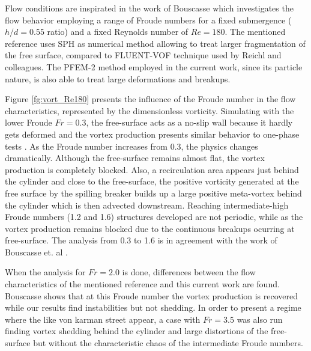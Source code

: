 Flow conditions are inspirated in the work of Bouscasse \cite{Bouscasse14} which investigates the flow behavior employing a range of Froude numbers for a fixed submergence ($h/d=0.55$ ratio) and a fixed Reynolds number of $Re=180$. The mentioned reference uses SPH as numerical method allowing to treat larger fragmentation of the free surface, compared to FLUENT-VOF technique used by Reichl and colleagues. The PFEM-2 method employed in the current work, since its particle nature, is also able to treat large deformations and breakups.

Figure \ref{fg:vort_Re180} presents the influence of the Froude number in the flow characteristics, represented by the dimensionless vorticity. Simulating with the lower Froude $Fr=0.3$, the free-surface acts as a no-slip wall because it hardly gets deformed and the vortex production presents similar behavior to one-phase tests \cite{PRICE2002175}. As the Froude number increases from 0.3, the physics changes dramatically. Although the free-surface remains almost flat, the vortex production is completely blocked. Also, a recirculation area appears just behind the cylinder and close to the free-surface, the positive vorticity generated at the free surface by the spilling breaker builds up a large positive meta-vortex behind the cylinder which is then advected downstream. Reaching intermediate-high Froude numbers (1.2 and 1.6) structures developed are not periodic, while as the vortex production remains blocked due to the continuous breakups ocurring at free-surface. The analysis from 0.3 to 1.6 is in agreement with the work of Bouscasse et. al \cite{Bouscasse14}.

When the analysis for $Fr=2.0$ is done, differences between the flow characteristics of the mentioned reference and this current work are found. Bouscasse shows that at this Froude number the vortex production is recovered while our results find instabilities but not shedding. In order to present a regime where the like von karman street appear, a case with $Fr=3.5$ was also run finding vortex shedding behind the cylinder and large distortions of the free-surface but without the characteristic chaos of the intermediate Froude numbers.


